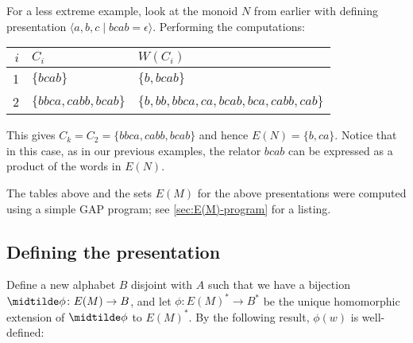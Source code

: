 \documentclass[noindex,noinsetproof,12pt]{lmaths}
\begin{document}
\begin{example} \label{ex:monoidN}
	For a less extreme example, look at the monoid $N$ from earlier with defining presentation $\langle a, b, c \mid bcab = \epsilon\rangle$. Performing the computations:

	\begin{center}
	\renewcommand{\arraystretch}{1.2}
	\begin{tabular}{r|ll}
		$i$ & $C_i$ & $W(C_i)$ \\ \hline
		1 & $\{bcab\}$ & $\{b, bcab\}$ \\
		2 & $\{bbca, cabb, bcab\}$ & $\{b, bb, bbca, ca, bcab, bca, cabb, cab\}$
	\end{tabular}
	\end{center}

	This gives $C_k = C_2 = \{bbca, cabb, bcab\}$ and hence $E(N) = \{b, ca\}$. Notice that in this case, as in our previous examples, the relator $bcab$ can be expressed as a product of the words in $E(N)$.

\end{example}

The tables above and the sets $E(M)$ for the above presentations were computed using a simple GAP program; see \cref{sec:E(M)-program} for a listing.


\subsection{Defining the presentation} \label{sec:defining-presentation}

Define a new alphabet $B$ disjoint with $A$ such that we have a bijection $\midtilde\phi \colon E(M) \to B$, and let $\phi \colon E(M)^* \to B^*$ be the unique homomorphic extension of $\midtilde\phi$ to $E(M)^*$. By the following result, $\phi(w)$ is well-defined:
\end{document}
